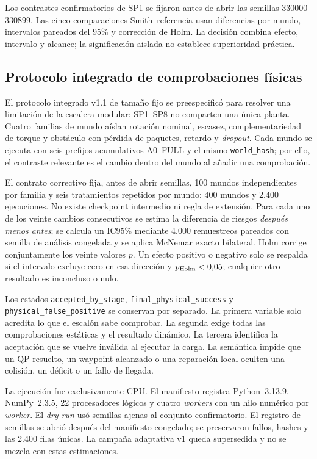 Los contrastes confirmatorios de SP1 se fijaron antes de abrir las semillas 330000--330899. Las cinco comparaciones Smith--referencia usan diferencias por mundo, intervalos pareados del 95\% y corrección de Holm. La decisión combina efecto, intervalo y alcance; la significación aislada no establece superioridad práctica.

\subsection{Protocolo integrado de comprobaciones físicas}

El protocolo integrado v1.1 de tamaño fijo se preespecificó para resolver una limitación de la escalera modular: SP1--SP8 no comparten una única planta. Cuatro familias de mundo aíslan rotación nominal, escasez, complementariedad de torque y obstáculo con pérdida de paquetes, retardo y \emph{dropout}. Cada mundo se ejecuta con seis prefijos acumulativos A0--FULL y el mismo \texttt{world\_hash}; por ello, el contraste relevante es el cambio dentro del mundo al añadir una comprobación.

El contrato correctivo fija, antes de abrir semillas, 100 mundos independientes por familia y seis tratamientos repetidos por mundo: 400 mundos y 2.400 ejecuciones. No existe checkpoint intermedio ni regla de extensión. Para cada uno de los veinte cambios consecutivos se estima la diferencia de riesgos \emph{después menos antes}; se calcula un IC95\% mediante 4.000 remuestreos pareados con semilla de análisis congelada y se aplica McNemar exacto bilateral. Holm corrige conjuntamente los veinte valores $p$. Un efecto positivo o negativo solo se respalda si el intervalo excluye cero en esa dirección y $p_{\rm Holm}<0{,}05$; cualquier otro resultado es inconcluso o nulo.

Los estados \texttt{accepted\_by\_stage}, \texttt{final\_physical\_success} y \texttt{physical\_false\_positive} se conservan por separado. La primera variable solo acredita lo que el escalón sabe comprobar. La segunda exige todas las comprobaciones estáticas y el resultado dinámico. La tercera identifica la aceptación que se vuelve inválida al ejecutar la carga. La semántica impide que un QP resuelto, un waypoint alcanzado o una reparación local oculten una colisión, un déficit o un fallo de llegada.

La ejecución fue exclusivamente CPU. El manifiesto registra Python~3.13.9, NumPy~2.3.5, 22 procesadores lógicos y cuatro \emph{workers} con un hilo numérico por \emph{worker}. El \emph{dry-run} usó semillas ajenas al conjunto confirmatorio. El registro de semillas se abrió después del manifiesto congelado; se preservaron fallos, hashes y las 2.400 filas únicas. La campaña adaptativa v1 queda supersedida y no se mezcla con estas estimaciones.
